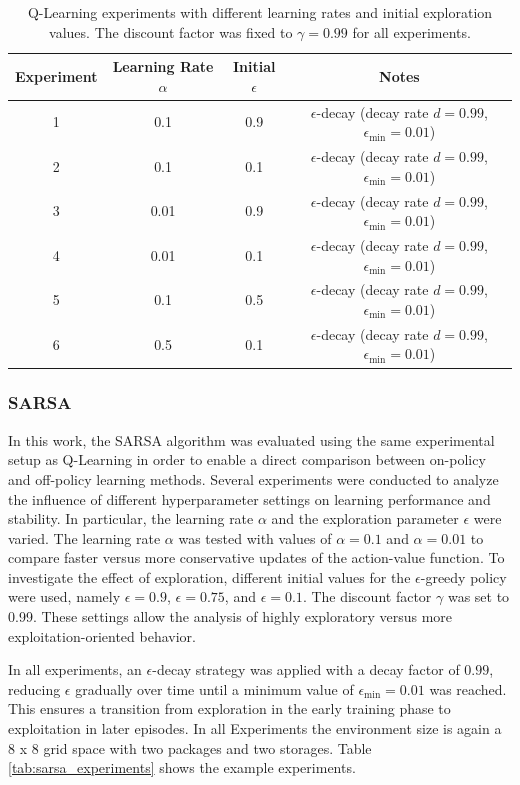 \documentclass[a4paper,11pt]{article}
\theoremstyle{definition}
\begin{document}
\begin{table}[h]
\centering
\begin{tabular}{|c|c|c|c|}
\hline
\textbf{Experiment} & \textbf{Learning Rate $\alpha$} & \textbf{Initial $\epsilon$} & \textbf{Notes} \\
\hline
1 & 0.1  & 0.9  & $\epsilon$-decay (decay rate $d = 0.99$, $\epsilon_{\min} = 0.01$) \\
2 & 0.1  & 0.1  & $\epsilon$-decay (decay rate $d = 0.99$, $\epsilon_{\min} = 0.01$) \\
3 & 0.01 & 0.9  & $\epsilon$-decay (decay rate $d = 0.99$, $\epsilon_{\min} = 0.01$) \\
4 & 0.01 & 0.1  & $\epsilon$-decay (decay rate $d = 0.99$, $\epsilon_{\min} = 0.01$) \\
5 & 0.1  & 0.5  & $\epsilon$-decay (decay rate $d = 0.99$, $\epsilon_{\min} = 0.01$) \\
6 & 0.5 & 0.1 & $\epsilon$-decay (decay rate $d = 0.99$, $\epsilon_{\min} = 0.01$) \\
\hline
\end{tabular}
\caption{Q-Learning experiments with different learning rates and initial exploration values. The discount factor was fixed to $\gamma = 0.99$ for all experiments.}
\label{tab:qlearning_experiments}
\end{table}


\subsubsection{SARSA}
In this work, the SARSA algorithm was evaluated using the same experimental setup as Q-Learning in order to enable a direct comparison between on-policy and off-policy learning methods. Several experiments were conducted to analyze the influence of different hyperparameter settings on learning performance and stability. In particular, the learning rate $\alpha$ and the exploration parameter $\epsilon$ were varied. The learning rate $\alpha$ was tested with values of $\alpha = 0.1$ and $\alpha = 0.01$ to compare faster versus more conservative updates of the action-value function. To investigate the effect of exploration, different initial values for the $\epsilon$-greedy policy were used, namely $\epsilon = 0.9$, $\epsilon = 0.75$, and $\epsilon = 0.1$. The discount factor $\gamma$ was set to 0.99. These settings allow the analysis of highly exploratory versus more exploitation-oriented behavior.

In all experiments, an $\epsilon$-decay strategy was applied with a decay factor of $0.99$, reducing $\epsilon$ gradually over time until a minimum value of $\epsilon_{\min} = 0.01$ was reached. This ensures a transition from exploration in the early training phase to exploitation in later episodes. In all Experiments the environment size is again a 8 x 8 grid space with two packages and two storages. Table \ref{tab:sarsa_experiments} shows the example experiments.
\end{document}
